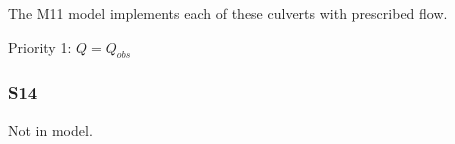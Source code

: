 The M11 model implements each of these culverts with prescribed flow.

\begin{packed_items}
\item Priority 1: $Q = Q_{obs}$
\end{packed_items}


%
%
%
%
%


\clearpage
\subsubsection{S14}
Not in model.

